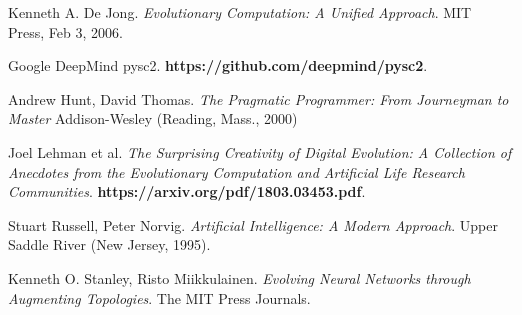 \documentclass{article}
\begin{document}
\begin{thebibliography}{9}

  Kenneth A. De Jong.
  \textit{Evolutionary Computation: A Unified Approach}.
  MIT Press, Feb 3, 2006.

  Google DeepMind pysc2.
  \textbf{https://github.com/deepmind/pysc2}.

  Andrew Hunt, David Thomas.
  \textit{The Pragmatic Programmer: From Journeyman to Master}
  Addison-Wesley (Reading, Mass., 2000)

  Joel Lehman et al.
  \textit{The Surprising Creativity of Digital Evolution: A Collection of
    Anecdotes from the Evolutionary Computation and Artificial Life Research
    Communities}.
  \textbf{https://arxiv.org/pdf/1803.03453.pdf}.

  Stuart Russell, Peter Norvig.
  \textit{Artificial Intelligence: A Modern Approach}.
  Upper Saddle River (New Jersey, 1995).
  
  Kenneth O. Stanley, Risto Miikkulainen.
  \textit{Evolving Neural Networks through Augmenting Topologies}. 
  The MIT Press Journals.




\end{thebibliography}
\end{document}
